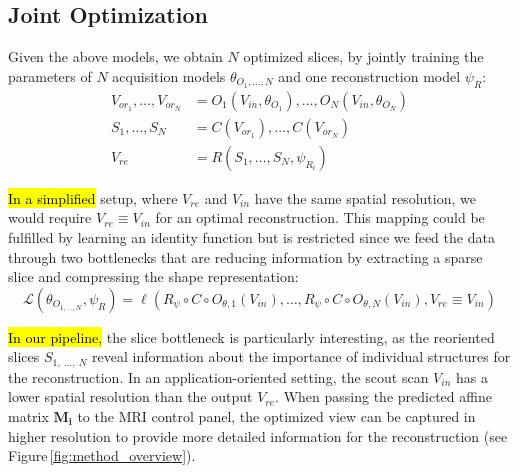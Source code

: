     \subsection{Joint Optimization}
     Given the above models, we obtain $N$ optimized slices, by jointly training the parameters of $N$ acquisition models $\theta_{O_1,\dots,N}$ and one reconstruction model $\psi_R$:
    \begin{align}
        V_{or_1},\dots,V_{or_N} &= O_1\left(V_{in},\theta_{O_1}\right),\dots, O_N\left(V_{in}, \theta_{O_N}\right) \label{eq:joint_slicing}\\
        S_1,\dots,S_N &= C\left(V_{or_1}\right), \dots, C\left(V_{or_N}\right)\\
        V_{re} &= R\left(S_{1},\dots,S_{N},\psi_{R_i}\right)\label{eq:joint_recon}
    \end{align}

   \hl{In a simplified} %
 setup, where $V_{re}$ and $V_{in}$ have the same spatial resolution, we would require $ V_{re} \equiv V_{in}$ for an optimal reconstruction.
    This mapping could be fulfilled by learning an identity function but is restricted since we feed the data through two bottlenecks that are reducing information by extracting a sparse slice and compressing the shape representation:
    \begin{equation}
         \mathcal{L}\left(\theta_{O_{1,\dots,N}}, \psi_R\right) = \ell\left(R_{\psi} \circ C \circ O_{\theta,1}\left(V_{in}\right),\dots, R_{\psi} \circ C \circ O_{\theta,N}\left(V_{in}\right), V_{re} \equiv V_{in}\right)\label{eq:loss}
    \end{equation}

    \hl{In our pipeline,} %
 the slice bottleneck is particularly interesting, as the reoriented slices $S_{1,~\dots,~N}$ reveal information about the importance of individual structures for the reconstruction.
    In an application-oriented setting, the scout scan $V_{in}$ has a lower spatial resolution than the output $V_{re}$.
    When passing the predicted affine matrix $\mathbf{M_i}$ to the MRI control panel, the optimized view can be captured in higher resolution to provide more detailed information for the reconstruction (see Figure\,\ref{fig:method_overview}).

